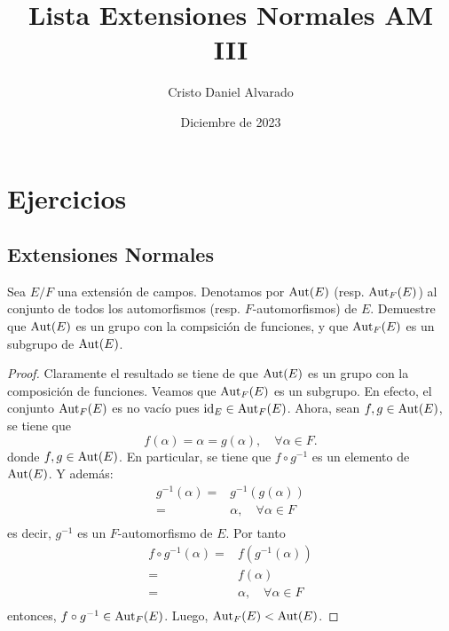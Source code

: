 \documentclass[12pt]{report}
\theoremstyle{largebreak}
\begin{document}
    \title{Lista Extensiones Normales AM III}
    \author{Cristo Daniel Alvarado}
    \date{Diciembre de 2023}
    \maketitle

\setcounter{chapter}{2}

\chapter{Ejercicios}

\section{Extensiones Normales}

\begin{excer}
    Sea $E/F$ una extensión de campos. Denotamos por $\textup{Aut}(E)$ (resp. $\textup{Aut}_F(E)$) al conjunto de todos los automorfismos (resp. $F$-automorfismos) de $E$. Demuestre que $\textup{Aut}(E)$ es un grupo con la compsición de funciones, y que $\textup{Aut}_F(E)$ es un subgrupo de $\textup{Aut}(E)$.
\end{excer}

\begin{proof}
    Claramente el resultado se tiene de que $\textup{Aut}(E)$ es un grupo con la composición de funciones. Veamos que $\textup{Aut}_F(E)$ es un subgrupo. En efecto, el conjunto $\textup{Aut}_F(E)$ es no vacío pues $\textup{id}_E\in\textup{Aut}_F(E)$. Ahora, sean $f,g\in\textup{Aut}(E)$, se tiene que
    \begin{equation}
        f(\alpha)=\alpha=g(\alpha),\quad\forall \alpha\in F.
    \end{equation}
    donde $f,g\in \textup{Aut}(E)$. En particular, se tiene que $f\circ g^{-1}$ es un elemento de $\textup{Aut}(E)$. Y además:
    \begin{equation}
        \begin{split}
            g^{-1}(\alpha)=&g^{-1}(g(\alpha))\\
            =&\alpha,\quad \forall\alpha\in F\\
        \end{split}
    \end{equation}
    es decir, $g^{-1}$ es un $F$-automorfismo de $E$. Por tanto
    \begin{equation}
        \begin{split}
            f\circ g^{-1}(\alpha)=&f(g^{-1}(\alpha))\\
            =&f(\alpha)\\
            =&\alpha,\quad \forall \alpha\in F\\
        \end{split}
    \end{equation}
    entonces, $f\circ g^{-1}\in \textup{Aut}_F(E)$. Luego, $\textup{Aut}_F(E)<\textup{Aut}(E)$.
\end{proof}
\end{document}
